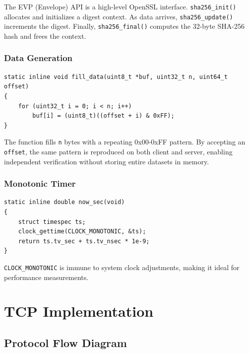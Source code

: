 \documentclass[12pt,a4paper]{article}
\begin{document}
The EVP (Envelope) API is a high-level OpenSSL interface. \texttt{sha256\_init()} allocates and initializes a digest context. As data arrives, \texttt{sha256\_update()} increments the digest. Finally, \texttt{sha256\_final()} computes the 32-byte SHA-256 hash and frees the context.

\subsubsection{Data Generation}

\begin{lstlisting}[caption=fill\_data: Deterministic pattern generation,label=lst:filldata]
static inline void fill_data(uint8_t *buf, uint32_t n, uint64_t offset)
{
    for (uint32_t i = 0; i < n; i++)
        buf[i] = (uint8_t)((offset + i) & 0xFF);
}
\end{lstlisting}

The function fills \texttt{n} bytes with a repeating 0x00-0xFF pattern. By accepting an \texttt{offset}, the same pattern is reproduced on both client and server, enabling independent verification without storing entire datasets in memory.

\subsubsection{Monotonic Timer}

\begin{lstlisting}[caption=now\_sec: High-resolution timer,label=lst:timer]
static inline double now_sec(void)
{
    struct timespec ts;
    clock_gettime(CLOCK_MONOTONIC, &ts);
    return ts.tv_sec + ts.tv_nsec * 1e-9;
}
\end{lstlisting}

\texttt{CLOCK\_MONOTONIC} is immune to system clock adjustments, making it ideal for performance measurements.

\section{TCP Implementation}
\label{sec:tcp}

\subsection{Protocol Flow Diagram}
\end{document}
